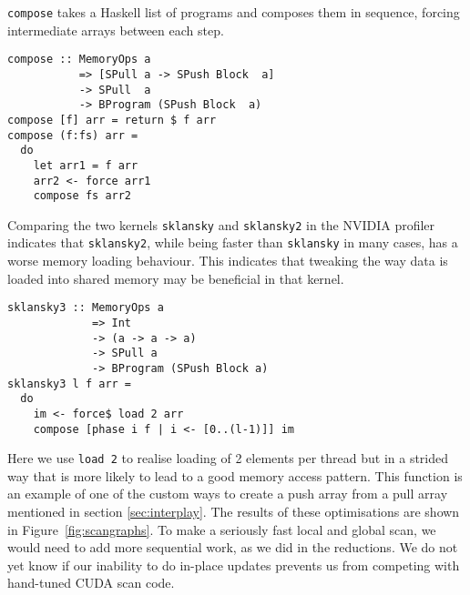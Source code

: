 {\tt compose} takes a Haskell list of programs and composes 
them in sequence, forcing intermediate arrays between each step.

\begin{small} 
\begin{Verbatim}[samepage=true] 
compose :: MemoryOps a
           => [SPull a -> SPush Block  a] 
           -> SPull  a
           -> BProgram (SPush Block  a)
compose [f] arr = return $ f arr
compose (f:fs) arr = 
  do
    let arr1 = f arr
    arr2 <- force arr1
    compose fs arr2
\end{Verbatim} 
\end{small} %

Comparing the two kernels {\tt sklansky} and {\tt sklansky2} in the 
NVIDIA profiler indicates that {\tt sklansky2}, while being faster than 
{\tt sklansky} in many cases, has a worse memory loading behaviour. This 
indicates that tweaking the way data is loaded into shared memory may 
be beneficial in that kernel. 


\begin{small} 
\begin{Verbatim}[samepage=true] 
sklansky3 :: MemoryOps a
             => Int
             -> (a -> a -> a)
             -> SPull a
             -> BProgram (SPush Block a)
sklansky3 l f arr =
  do
    im <- force$ load 2 arr 
    compose [phase i f | i <- [0..(l-1)]] im 
\end{Verbatim}
\end{small}  %

Here we use {\tt load 2} to realise loading of 2 elements per thread 
but in a strided way that is more likely to lead to a good memory access 
pattern. This function is an example of one of the custom ways to create a 
push array from a pull array mentioned in section \ref{sec:interplay}.
The results of these optimisations are shown in Figure~\ref{fig:scangraphs}.
To make a seriously fast local and global scan, we would need to add
more sequential work, as we did in the reductions. We do not yet know
if our inability to do in-place updates prevents us from competing with
hand-tuned CUDA scan code. 


